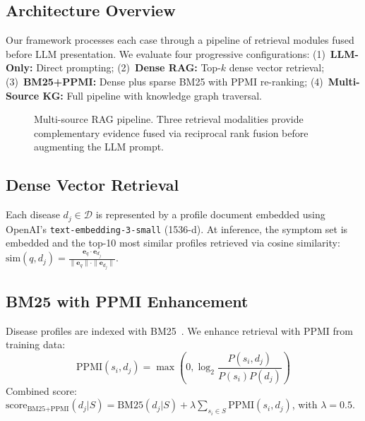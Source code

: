\documentclass[runningheads]{llncs}
\begin{document}
\subsection{Architecture Overview}

Our framework processes each case through a pipeline of retrieval modules fused before LLM presentation. We evaluate four progressive configurations:
(1)~\textbf{LLM-Only:} Direct prompting;
(2)~\textbf{Dense RAG:} Top-$k$ dense vector retrieval;
(3)~\textbf{BM25+PPMI:} Dense plus sparse BM25 with PPMI re-ranking;
(4)~\textbf{Multi-Source KG:} Full pipeline with knowledge graph traversal.

\begin{figure}[t]
\centering
{}
\caption{Multi-source RAG pipeline. Three retrieval modalities provide complementary evidence fused via reciprocal rank fusion before augmenting the LLM prompt.}
\label{fig:architecture}
\end{figure}

\subsection{Dense Vector Retrieval}
\label{sec:dense}

Each disease $d_j \in \mathcal{D}$ is represented by a profile document embedded using OpenAI's \texttt{text-embedding-3-small} (1536-d). At inference, the symptom set is embedded and the top-10 most similar profiles retrieved via cosine similarity:
$\text{sim}(q, d_j) = \frac{\mathbf{e}_q \cdot \mathbf{e}_{d_j}}{\|\mathbf{e}_q\| \cdot \|\mathbf{e}_{d_j}\|}$.

\subsection{BM25 with PPMI Enhancement}
\label{sec:bm25}

Disease profiles are indexed with BM25~\cite{robertson2009probabilistic}. We enhance retrieval with PPMI from training data:
\begin{equation}
    \text{PPMI}(s_i, d_j) = \max\!\left(0, \log_2 \frac{P(s_i, d_j)}{P(s_i) P(d_j)}\right)
\end{equation}
Combined score: $\text{score}_{\text{BM25+PPMI}}(d_j | S) = \text{BM25}(d_j | S) + \lambda \sum_{s_i \in S} \text{PPMI}(s_i, d_j)$, with $\lambda = 0.5$.
\end{document}
